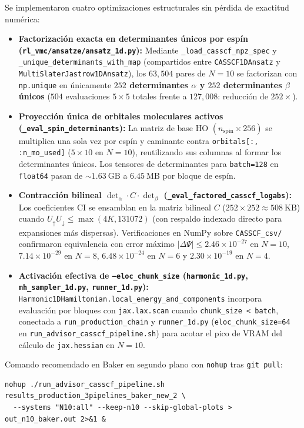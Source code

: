 \documentclass[10pt,a4paper]{article}
\begin{document}
Se implementaron cuatro optimizaciones estructurales sin pérdida de exactitud numérica:
\begin{itemize}
\item \textbf{Factorización exacta en determinantes únicos por espín (\texttt{rl\_vmc/ansatze/ansatz\_1d.py}):} Mediante \texttt{\_load\_casscf\_npz\_spec} y \texttt{\_unique\_determinants\_with\_map} (compartidos entre \texttt{CASSCF1DAnsatz} y \texttt{MultiSlaterJastrow1DAnsatz}), los $63{,}504$ pares de $N=10$ se factorizan con \texttt{np.unique} en únicamente \textbf{$252$ determinantes $\alpha$ y $252$ determinantes $\beta$ únicos} ($504$ evaluaciones $5\times 5$ totales frente a $127{,}008$: reducción de \textbf{$252\times$}).
\item \textbf{Proyección única de orbitales moleculares activos (\texttt{\_eval\_spin\_determinants}):} La matriz de base HO $(n_{\mathrm{spin}} \times 256)$ se multiplica una sola vez por espín y caminante contra \texttt{orbitals[:, :n\_mo\_used]} ($5 \times 10$ en $N=10$), reutilizando sus columnas al formar los determinantes únicos. Los tensores de determinantes para \texttt{batch=128} en \texttt{float64} pasan de $\sim 1.63\ \mathrm{GB}$ a \textbf{$6.45\ \mathrm{MB}$} por bloque de espín.
\item \textbf{Contracción bilineal $\det_\alpha \cdot C \cdot \det_\beta$ (\texttt{\_eval\_factored\_casscf\_logabs}):} Los coeficientes CI se ensamblan en la matriz bilineal $C$ ($252\times 252 \approx 508\ \mathrm{KB}$) cuando $U_\uparrow U_\downarrow \le \max(4K, 131072)$ (con respaldo indexado directo para expansiones más dispersas). Verificaciones en NumPy sobre \texttt{CASSCF\_csv/} confirmaron equivalencia con error máximo $|\Delta \Psi| \le 2.46\times 10^{-27}$ en $N=10$, $7.14\times 10^{-29}$ en $N=8$, $6.48\times 10^{-24}$ en $N=6$ y $2.30\times 10^{-19}$ en $N=4$.
\item \textbf{Activación efectiva de \texttt{--eloc\_chunk\_size} (\texttt{harmonic\_1d.py}, \texttt{mh\_sampler\_1d.py}, \texttt{runner\_1d.py}):} \texttt{Harmonic1DHamiltonian.local\_energy\_and\_components} incorpora evaluación por bloques con \texttt{jax.lax.scan} cuando \texttt{chunk\_size < batch}, conectada a \texttt{run\_production\_chain} y \texttt{runner\_1d.py} (\texttt{eloc\_chunk\_size=64} en \texttt{run\_advisor\_casscf\_pipeline.sh}) para acotar el pico de VRAM del cálculo de \texttt{jax.hessian} en $N=10$.
\end{itemize}

Comando recomendado en Baker en segundo plano con \texttt{nohup} tras \texttt{git pull}:
\begin{verbatim}
nohup ./run_advisor_casscf_pipeline.sh results_production_3pipelines_baker_new_2 \
  --systems "N10:all" --keep-n10 --skip-global-plots > out_n10_baker.out 2>&1 &
\end{verbatim}
\end{document}
